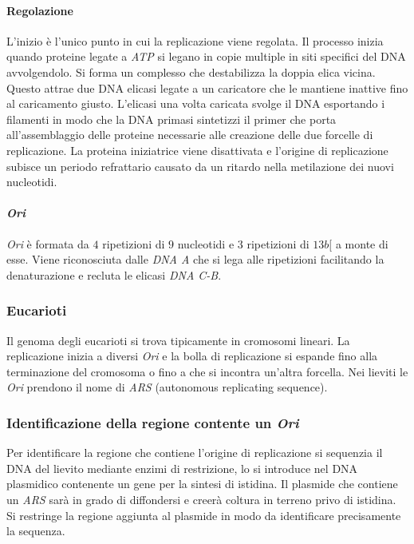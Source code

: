 			\paragraph{Regolazione}
			L'inizio \`e l'unico punto in cui la replicazione viene regolata.
			Il processo inizia quando proteine legate a \emph{ATP} si legano in copie multiple in siti specifici del DNA avvolgendolo.
			Si forma un complesso che destabilizza la doppia elica vicina.
			Questo attrae due DNA elicasi legate a un caricatore che le mantiene inattive fino al caricamento giusto.
			L'elicasi una volta caricata svolge il DNA esportando i filamenti in modo che la DNA primasi sintetizzi il primer che porta all'assemblaggio delle proteine  necessarie alle creazione delle due forcelle di replicazione.
			La proteina iniziatrice viene disattivata e l'origine di replicazione subisce un periodo refrattario causato da un ritardo nella metilazione dei nuovi nucleotidi.

			\paragraph{\emph{Ori}}
			\emph{Ori} \`e formata da $4$ ripetizioni di $9$ nucleotidi e $3$ ripetizioni di $13b[$ a monte di esse.
			Viene riconosciuta dalle \emph{DNA A} che si lega alle ripetizioni facilitando la denaturazione e recluta le elicasi \emph{DNA C-B}.

		\subsubsection{Eucarioti}
		Il genoma degli eucarioti si trova tipicamente in cromosomi lineari.
		La replicazione inizia a diversi \emph{Ori} e la bolla di replicazione si espande fino alla terminazione del cromosoma o fino a che si incontra un'altra forcella.
		Nei lieviti le \emph{Ori} prendono il nome di \emph{ARS} (autonomous replicating sequence).

		\subsubsection{Identificazione della regione contente un \emph{Ori}}
		Per identificare la regione che contiene l'origine di replicazione si sequenzia il DNA del lievito mediante enzimi di restrizione, lo si introduce nel DNA plasmidico contenente un gene per la sintesi di istidina.
		Il plasmide che contiene un \emph{ARS} sar\`a in grado di diffondersi e creer\`a coltura in terreno privo di istidina.
		Si restringe la regione aggiunta al plasmide in modo da identificare precisamente la sequenza.

